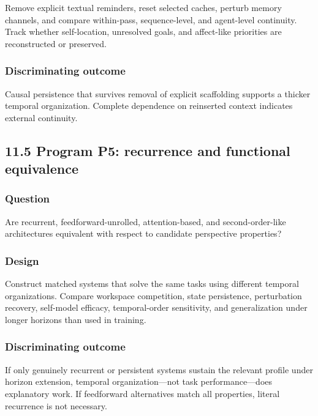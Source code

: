 \documentclass[
  11pt,
]{article}
\begin{document}
Remove explicit textual reminders, reset selected caches, perturb memory
channels, and compare within-pass, sequence-level, and agent-level
continuity. Track whether self-location, unresolved goals, and
affect-like priorities are reconstructed or preserved.

\subsubsection{Discriminating outcome}\label{discriminating-outcome-3}

Causal persistence that survives removal of explicit scaffolding
supports a thicker temporal organization. Complete dependence on
reinserted context indicates external continuity.

\subsection{11.5 Program P5: recurrence and functional
equivalence}\label{program-p5-recurrence-and-functional-equivalence}

\subsubsection{Question}\label{question-4}

Are recurrent, feedforward-unrolled, attention-based, and
second-order-like architectures equivalent with respect to candidate
perspective properties?

\subsubsection{Design}\label{design-4}

Construct matched systems that solve the same tasks using different
temporal organizations. Compare workspace competition, state
persistence, perturbation recovery, self-model efficacy, temporal-order
sensitivity, and generalization under longer horizons than used in
training.

\subsubsection{Discriminating outcome}\label{discriminating-outcome-4}

If only genuinely recurrent or persistent systems sustain the relevant
profile under horizon extension, temporal organization---not task
performance---does explanatory work. If feedforward alternatives match
all properties, literal recurrence is not necessary.
\end{document}
